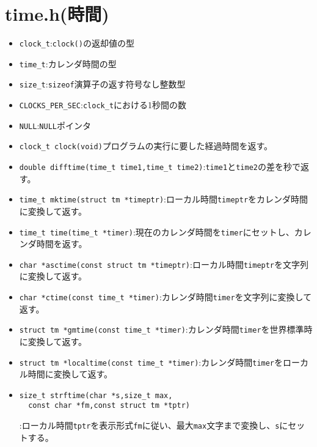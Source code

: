 \section{time.h(時間)}
\begin{itemize}
\item \verb|clock_t|:\verb|clock()|の返却値の型
\item \verb|time_t|:カレンダ時間の型
\item \verb|size_t|:\verb|sizeof|演算子の返す符号なし整数型
\item \verb|CLOCKS_PER_SEC|:\verb|clock_t|における1秒間の数
\item \verb|NULL|:\verb|NULL|ポインタ
\item \verb|clock_t clock(void)|プログラムの実行に要した経過時間を返す。
\item \verb|double difftime(time_t time1,time_t time2)|:\verb|time1|と\verb|time2|の差を秒で返す。
\item \verb|time_t mktime(struct tm *timeptr)|:ローカル時間\verb|timeptr|をカレンダ時間に変換して返す。
\item \verb|time_t time(time_t *timer)|:現在のカレンダ時間を\verb|timer|にセットし、カレンダ時間を返す。
\item \verb|char *asctime(const struct tm *timeptr)|:ローカル時間\verb|timeptr|を文字列に変換して返す。
\item \verb|char *ctime(const time_t *timer)|:カレンダ時間\verb|timer|を文字列に変換して返す。
\item \verb|struct tm *gmtime(const time_t *timer)|:カレンダ時間\verb|timer|を世界標準時に変換して返す。
\item \verb|struct tm *localtime(const time_t *timer)|:カレンダ時間\verb|timer|をローカル時間に変換して返す。
\item \begin{verbatim}
size_t strftime(char *s,size_t max,
  const char *fm,const struct tm *tptr)
\end{verbatim}:ローカル時間\verb|tptr|を表示形式\verb|fm|に従い、最大\verb|max|文字まで変換し、\verb|s|にセットする。
\end{itemize}

